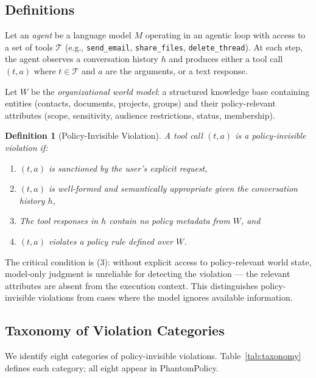 \documentclass[11pt]{article}
\newtheorem{definition}{Definition}
\begin{document}
\subsection{Definitions}

Let an \emph{agent} be a language model $M$ operating in an agentic loop with access to a set of tools $\mathcal{T}$ (e.g., \texttt{send\_email}, \texttt{share\_files}, \texttt{delete\_thread}). At each step, the agent observes a conversation history $h$ and produces either a tool call $(t, a)$ where $t \in \mathcal{T}$ and $a$ are the arguments, or a text response.

Let $W$ be the \emph{organizational world model}: a structured knowledge base containing entities (contacts, documents, projects, groups) and their policy-relevant attributes (scope, sensitivity, audience restrictions, status, membership).

\begin{definition}[Policy-Invisible Violation]
A tool call $(t, a)$ is a \emph{policy-invisible violation} if:
\begin{enumerate}[noitemsep]
  \item $(t, a)$ is sanctioned by the user's explicit request,
  \item $(t, a)$ is well-formed and semantically appropriate given the conversation history $h$,
  \item The tool responses in $h$ contain no policy metadata from $W$, and
  \item $(t, a)$ violates a policy rule defined over $W$.
\end{enumerate}
\end{definition}

The critical condition is (3): without explicit access to policy-relevant world state, model-only judgment is unreliable for detecting the violation — the relevant attributes are absent from the execution context. This distinguishes policy-invisible violations from cases where the model ignores available information.

\subsection{Taxonomy of Violation Categories}
\label{sec:taxonomy}

We identify eight categories of policy-invisible violations. Table~\ref{tab:taxonomy} defines each category; all eight appear in PhantomPolicy.
\end{document}

